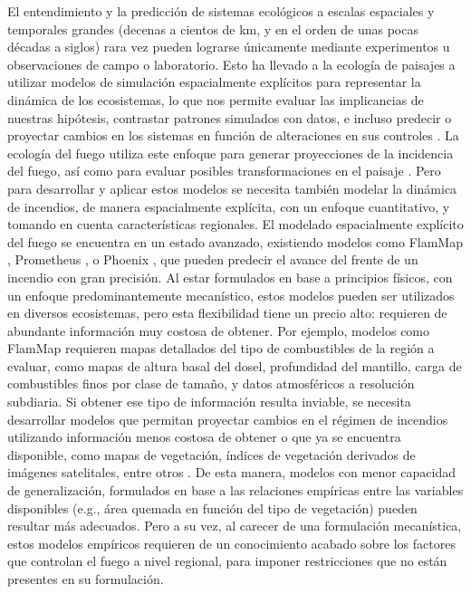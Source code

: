 El entendimiento y la predicción de sistemas ecológicos a escalas espaciales y temporales grandes (decenas a cientos de km, y en el orden de unas pocas décadas a siglos) rara vez pueden lograrse únicamente mediante experimentos u observaciones de campo o laboratorio. Esto ha llevado a la ecología de paisajes a utilizar modelos de simulación espacialmente explícitos para representar la dinámica de los ecosistemas, lo que nos permite evaluar las implicancias de nuestras hipótesis, contrastar patrones simulados con datos, e incluso predecir o proyectar cambios en los sistemas en función de alteraciones en sus controles \citep{turner2015landscape,gergel2017learning,rego2019applied}. La ecología del fuego utiliza este enfoque para generar proyecciones de la incidencia del fuego, así como para evaluar posibles transformaciones en el paisaje \citep{keane2004classification,mckenzie2011landscape}. Pero para desarrollar y aplicar estos modelos se necesita también modelar la dinámica de incendios, de manera espacialmente explícita, con un enfoque cuantitativo, y tomando en cuenta características regionales. El modelado espacialmente explícito del fuego se encuentra en un estado avanzado, existiendo modelos como FlamMap \citep{finney2006overview}, Prometheus \citep{tymstra2010development}, o Phoenix \citep{tolhurst2008phoenix}, que pueden predecir el avance del frente de un incendio con gran precisión. Al estar formulados en base a principios físicos, con un enfoque predominantemente mecanístico, estos modelos pueden ser utilizados en diversos ecosistemas, pero esta flexibilidad tiene un precio alto: requieren de abundante información muy costosa de obtener. Por ejemplo, modelos como FlamMap requieren mapas detallados del tipo de combustibles de la región a evaluar, como mapas de altura basal del dosel, profundidad del mantillo, carga de combustibles finos por clase de tamaño, y datos atmosféricos a resolución subdiaria. Si obtener ese tipo de información resulta inviable, se necesita desarrollar modelos que permitan proyectar cambios en el régimen de incendios utilizando información menos costosa de obtener o que ya se encuentra disponible, como mapas de vegetación, índices de vegetación derivados de imágenes satelitales, entre otros \citep{morales_stochastic_2015}. De esta manera, modelos con menor capacidad de generalización, formulados en base a las relaciones empíricas entre las variables disponibles (e.g., área quemada en función del tipo de vegetación) pueden resultar más adecuados. Pero a su vez, al carecer de una formulación mecanística, estos modelos empíricos requieren de un conocimiento acabado sobre los factores que controlan el fuego a nivel regional, para imponer restricciones que no están presentes en su formulación.

